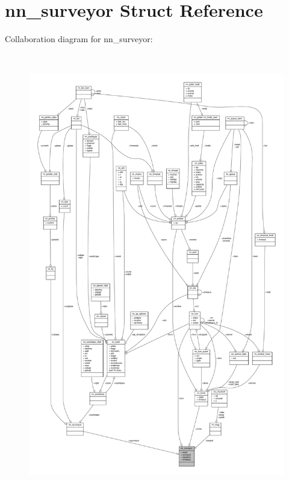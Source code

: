 \hypertarget{structnn__surveyor}{}\section{nn\+\_\+surveyor Struct Reference}
\label{structnn__surveyor}


Collaboration diagram for nn\+\_\+surveyor\+:\nopagebreak
\begin{figure}[H]
\begin{center}
\leavevmode
\includegraphics[height=550pt]{structnn__surveyor__coll__graph}
\end{center}
\end{figure}
